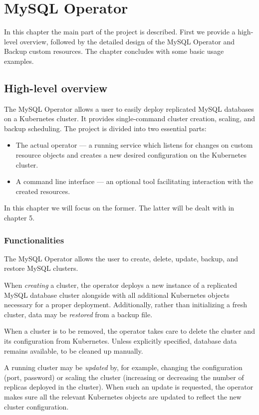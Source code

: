 \chapter{MySQL Operator}

In this chapter the main part of the project is described. First we provide
a high-level overview, followed by the detailed design of the MySQL Operator
and Backup custom resources. The chapter concludes with some basic usage examples.

\section{High-level overview}
The MySQL Operator allows a user to easily deploy replicated MySQL databases on a Kubernetes cluster.
It provides single-command cluster creation, scaling, and backup scheduling. The project is divided
into two essential parts:
\begin{itemize}
	\item The actual operator --- a running service which listens for changes on custom resource
	objects and creates a new desired configuration on the Kubernetes cluster.
	\item A command line interface --- an optional tool facilitating interaction with the created
	resources.
\end{itemize}

In this chapter we will focus on the former. The latter will be dealt with in chapter 5.

\subsection{Functionalities}
The MySQL Operator allows the user to create, delete, update, backup, and restore MySQL clusters.

When \textit{creating} a cluster, the operator deploys a new instance of a replicated MySQL
database cluster alongside with all additional Kubernetes objects necessary for a proper deployment.
Additionally, rather than initializing a fresh cluster, data may be \textit{restored} from a backup file.

When a cluster is to be removed, the operator takes care to delete the cluster and its
configuration from Kubernetes. Unless explicitly specified, database data remains available, to be
cleaned up manually.

A running cluster may be \textit{updated} by, for example, changing the configuration (port,
password) or scaling the cluster (increasing or decreasing the number of replicas deployed in the
cluster). When such an update is requested, the operator makes sure all the relevant Kubernetes
objects are updated to reflect the new cluster configuration.

